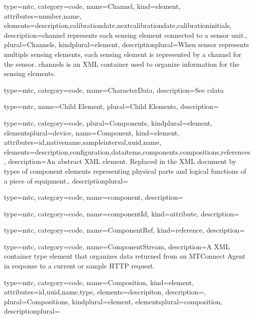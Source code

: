 {
  type=mtc,
  category=code,
  name={Channel},
  kind={element},
  attributes={\gls{number},\gls{name}},
  elements={\gls{description},\gls{calibrationdate},\gls{nextcalibrationdate},\gls{calibrationinitials}},
  description={\gls{channel} represents each \gls{sensing element} connected to a \gls{sensor unit}.},
  plural={Channels},
  kindplural={element},
  descriptionplural={When \gls{sensor} represents multiple \glspl{sensing element}, each \gls{sensing element} is represented by a \gls{channel} for the \gls{sensor}. \glspl{channel} is an XML container used to organize information for the \glspl{sensing element}. }
}


{
  type=mtc,
  category=code,
  name={CharacterData},
  description={See \gls{cdata}}
}


{
  type=mtc,
  name={Child Element},
  plural={Child Elements},
  description={}
}


{
  type=mtc,
  category=code,
  plural={Components},
  kindplural={element},
  elementsplural={\gls{device}},
  name={Component},
  kind={element},
  attributes={\gls{id},\gls{nativename},\gls{sampleinterval},\gls{uuid},\gls{name}},
  elements={\gls{description},\gls{configuration},\glspl{dataitem},\glspl{component},\glspl{composition},\glspl{reference}},
  description={An abstract XML element. Replaced in the XML document by types of \gls{component} elements representing physical parts and logical functions of a piece of equipment.},
  descriptionplural={} 
}


{
  type=mtc,
  category=code,
  name={component},
  description={}
}


{
  type=mtc,
  category=code,
  name={componentId},
  kind={attribute},
  description={}
}


{
  type=mtc,
  category=code,
  name={ComponentRef},
  kind={reference},
  description={} 
}


{
  type=mtc,
  category=code,
  name={ComponentStream},
  description={A XML container type element that organizes data returned from an MTConnect Agent in response to a current or sample HTTP request.} 
}


{
  type=mtc,
  category=code,
  name={Composition},
  kind={element},
  attributes={\gls{id},\gls{uuid},\gls{name},\gls{type}},
  elements={\gls{descripiton}},
  description={},
  plural={Compositions},
  kindplural={element},
  elementsplural={\gls{composition}},
  descriptionplural={}
}


